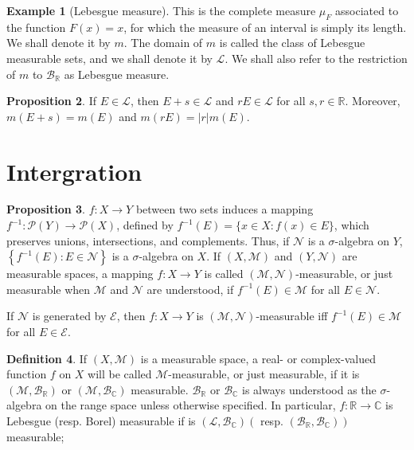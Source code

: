 \documentclass[12pt,a4paper]{book}
\theoremstyle{definition}
\newtheorem{defn}{Definition}[section]
\newtheorem{prop}[defn]{Proposition}
\newtheorem{exam}[defn]{Example}
\begin{document}
\begin{exam}[Lebesgue measure]
    This is the complete measure $\mu_F$ associated to the function $F(x)=x$, for which the measure of an interval is simply its length. We shall denote it by $m$. The domain of $m$ is called the class of Lebesgue measurable sets, and we shall denote it by $\mathcal{L}$. We shall also refer to the restriction of $m$ to $\mathcal{B}_{\mathbb{R}}$ as Lebesgue measure.
\end{exam}
\begin{prop}
    If $E \in \mathcal{L}$, then $E+s \in \mathcal{L}$ and $r E \in \mathcal{L}$ for all $s, r \in \mathbb{R}$. Moreover, $m(E+s)=m(E)$ and $m(r E)=|r| m(E)$.
\end{prop}


\section{Intergration}
\begin{prop}
    $f: X \rightarrow Y$ between two sets induces a mapping $f^{-1}: \mathcal{P}(Y) \rightarrow \mathcal{P}(X)$, defined by $f^{-1}(E)=\{x \in X: f(x) \in E\}$, which preserves unions, intersections, and complements. Thus, if $\mathcal{N}$ is a $\sigma$-algebra on $Y$, $\left\{f^{-1}(E): E \in \mathcal{N}\right\}$ is a $\sigma$-algebra on $X$. If $(X, \mathcal{M})$ and $(Y, \mathcal{N})$ are measurable spaces, a mapping $f: X \rightarrow Y$ is called $(\mathcal{M}, \mathcal{N})$-measurable, or just measurable when $\mathcal{M}$ and $\mathcal{N}$ are understood, if $f^{-1}(E) \in \mathcal{M}$ for all $E \in \mathcal{N}$.

    If $\mathcal{N}$ is generated by $\mathcal{E}$, then $f: X \rightarrow Y$ is $(\mathcal{M}, \mathcal{N})$-measurable iff $f^{-1}(E) \in \mathcal{M}$ for all $E \in \mathcal{E}$.
\end{prop}
\begin{defn}
    If $(X, \mathcal{M})$ is a measurable space, a real- or complex-valued function $f$ on $X$ will be called $\mathcal{M}$-measurable, or just measurable, if it is $\left(\mathcal{M}, \mathcal{B}_{\mathbb{R}}\right)$ or
    $\left(\mathcal{M}, \mathcal{B}_{\mathbb{C}}\right)$ measurable.
    $\mathcal{B}_{\mathbb{R}}$ or $\mathcal{B}_{\mathbb{C}}$ is always understood as the $\sigma$-algebra on the range space unless otherwise specified.
    In particular, $f: \mathbb{R} \rightarrow \mathbb{C}$ is Lebesgue (resp. Borel) measurable if is $\left(\mathcal{L}, \mathcal{B}_{\mathbb{C}}\right)\left(\right.$ resp. $\left.\left(\mathcal{B}_{\mathbb{R}}, \mathcal{B}_{\mathbb{C}}\right)\right)$ measurable;
\end{defn}
\end{document}
